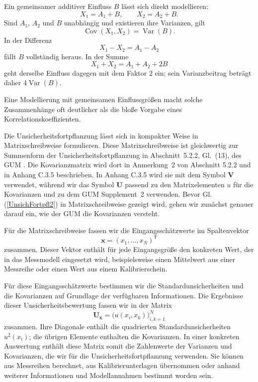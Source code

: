 Ein gemeinsamer additiver Einfluss $B$ lässt sich direkt
modellieren:
\begin{equation}
X_1=A_1+B,\qquad X_2=A_2+B.
\end{equation}
Sind $A_1$, $A_2$ und $B$ unabhängig und existieren ihre
Varianzen, gilt
\begin{equation}
\operatorname{Cov}(X_1,X_2)=\operatorname{Var}(B).
\end{equation}
In der Differenz
\begin{equation}
X_1-X_2=A_1-A_2
\end{equation}
fällt $B$ vollständig heraus. In der Summe
\begin{equation}
X_1+X_2=A_1+A_2+2B
\end{equation}
geht derselbe Einfluss dagegen mit dem Faktor $2$ ein;
sein Varianzbeitrag beträgt daher $4\operatorname{Var}(B)$.

Eine Modellierung mit gemeinsamen Einflussgrößen macht solche
Zusammenhänge oft deutlicher als die bloße Vorgabe eines
Korrelationskoeffizienten.

Die Unsicherheitsfortpflanzung lässt sich in kompakter Weise in Matrixschreibweise formulieren. Diese Matrixschreibweise ist gleichwertig zur Summenform der Unsicherheitsfortpflanzung in Abschnitt~5.2.2,
Gl.~(13), des GUM \cite{GUM95}. Die Kovarianzmatrix wird dort
in Anmerkung~2 von Abschnitt 5.2.2 und in Anhang C.3.5 beschrieben. In Anhang C.3.5 wird sie mit dem Symbol $\mathbf V$ verwendet, während wir das Symbol $\mathbf U$ passend zu den Matrixelementen $u$ für die Kovarianzen und zu dem GUM Supplement~2 verwenden. Bevor Gl. (\ref{UnsichFortpfl2}) in Matrixschreibweise gezeigt wird, gehen wir zunächst genauer darauf ein, wie der GUM die Kovarianzen versteht.

Für die Matrixschreibweise fassen wir die Eingangsschätzwerte im Spaltenvektor
\begin{equation}
\mathbf x=(x_1,\dots,x_N)^\mathsf T
\end{equation}
zusammen. Dieser Vektor enthält für jede Eingangsgröße den
konkreten Wert, der in das Messmodell eingesetzt wird,
beispielsweise einen Mittelwert aus einer Messreihe oder
einen Wert aus einem Kalibrierschein.

Für diese Eingangsschätzwerte bestimmen wir die
Standardunsicherheiten und die Kovarianzen auf Grundlage
der verfügbaren Informationen. Die Ergebnisse dieser
Unsicherheitsbewertung fassen wir in der Matrix
\begin{equation}
\mathbf U_{\mathbf x}
=
\bigl(u(x_i,x_k)\bigr)_{i,k=1}^{N}
\label{covmatrixGUMskalar}
\end{equation}
zusammen. Ihre Diagonale enthält die quadrierten
Standardunsicherheiten $u^2(x_i)$; die übrigen Elemente
enthalten die Kovarianzen. In einer konkreten Auswertung
enthält diese Matrix somit die Zahlenwerte der Varianzen
und Kovarianzen, die wir für die Unsicherheitsfortpflanzung
verwenden. Sie können aus Messreihen berechnet, aus
Kalibrierunterlagen übernommen oder anhand weiterer
Informationen und Modellannahmen bestimmt worden sein.

